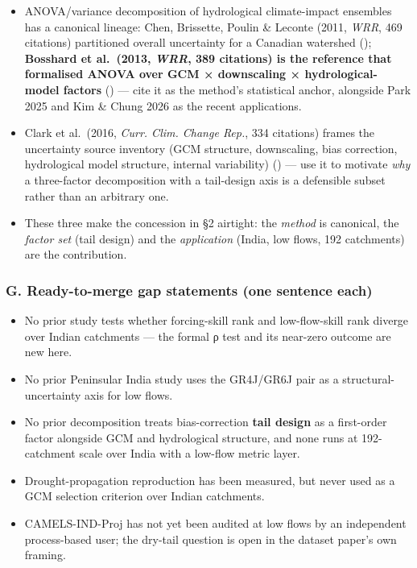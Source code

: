 \documentclass[
  english,
  11pt,
]{article}
\newcounter{none} %
\providecommand{\tightlist}{%
  \setlength{\itemsep}{0pt}\setlength{\parskip}{0pt}}
\begin{document}
\begin{itemize}
\tightlist
\item
  ANOVA/variance decomposition of hydrological climate-impact ensembles
  has a canonical lineage: Chen, Brissette, Poulin \& Leconte (2011,
  \emph{WRR}, 469 citations) partitioned overall uncertainty for a
  Canadian watershed (); \textbf{Bosshard et al.~(2013, \emph{WRR}, 389 citations) is
  the reference that formalised ANOVA over GCM × downscaling ×
  hydrological-model factors}
  () ---
  cite it as the method's statistical anchor, alongside Park 2025 and
  Kim \& Chung 2026 as the recent applications.
\item
  Clark et al.~(2016, \emph{Curr. Clim. Change Rep.}, 334 citations)
  frames the uncertainty source inventory (GCM structure, downscaling,
  bias correction, hydrological model structure, internal variability)
  () --- use it
  to motivate \emph{why} a three-factor decomposition with a tail-design
  axis is a defensible subset rather than an arbitrary one.
\item
  These three make the concession in §2 airtight: the \emph{method} is
  canonical, the \emph{factor set} (tail design) and the
  \emph{application} (India, low flows, 192 catchments) are the
  contribution.
\end{itemize}

\subsubsection{G. Ready-to-merge gap statements (one sentence
each)}\label{g.-ready-to-merge-gap-statements-one-sentence-each}

\begin{itemize}
\tightlist
\item
  No prior study tests whether forcing-skill rank and low-flow-skill
  rank diverge over Indian catchments --- the formal ρ test and its
  near-zero outcome are new here.
\item
  No prior Peninsular India study uses the GR4J/GR6J pair as a
  structural-uncertainty axis for low flows.
\item
  No prior decomposition treats bias-correction \textbf{tail design} as
  a first-order factor alongside GCM and hydrological structure, and
  none runs at 192-catchment scale over India with a low-flow metric
  layer.
\item
  Drought-propagation reproduction has been measured, but never used as
  a GCM selection criterion over Indian catchments.
\item
  CAMELS-IND-Proj has not yet been audited at low flows by an
  independent process-based user; the dry-tail question is open in the
  dataset paper's own framing.
\end{itemize}
\end{document}
